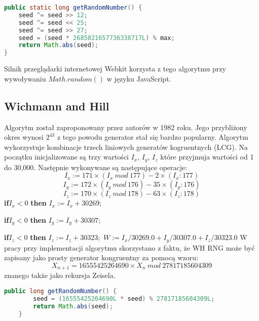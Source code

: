 \documentclass[a4paper, 11pt]{article} %
\begin{document}
\begin{lstlisting}[style=mystyle, language=java, frame=single, caption = Generowanie następnej liczby pseudolosowej przez Xorshift]
public static long getRandomNumber() {
    seed ^= seed >> 12;
    seed ^= seed << 25;
    seed ^= seed >> 27;
    seed = (seed * 2685821657736338717L) % max;
    return Math.abs(seed);
}
\end{lstlisting}
Silnik przeglądarki internetowej Webkit korzysta z tego algorytmu przy wywoływaniu $Math.random()$ w języku JavaScript.
\subsection{Wichmann and Hill}
Algorytm został zaproponowany przez autorów w 1982 roku. Jego przybliżony okres wynosi $2^{43}$ z tego powodu generator stał się bardzo popularny. Algorytm wykorzystuje kombinacje trzech liniowych generatów kogruentnych (LCG). Na początku inicjalizowane są trzy wartości $I_x$, $I_y$, $ I_z$ które przyjmuja wartości od 1 do 30,000. Następnie wykonywane są następujące operacje: 
$$I_x := 171 \times (I_x \  mod \ 177) - 2 \times (I_x : 177) $$
$$I_y := 172 \times (I_y\ mod\ 176) - 35 \times (I_y : 176) $$
$$ I_z := 170 \times (I_z\ mod \ 178) - 63 \times (I_z : 178)$$
\textbf{if}$I_x < 0$ \textbf{then}
\newline \indent	$I_x := I_x + 30269;$

\noindent \textbf{if}$I_y < 0$ \textbf{then}
\newline \indent	$I_y := I_y + 30307;$

\noindent \textbf{if}$I_z < 0$ \textbf{then}
\newline \indent	$I_z := I_z + 30323;$
\noindent \newline $W := I_x/30269.0 + I_y/30307.0 + I_z/30323.0$
\newline W pracy przy implementacji algorytmu skorzystano z faktu, że WH RNG może być zapisany jako prosty generator kongruentny za pomocą wzoru: 
$$X_{n+1} = 16555425264690 \times X_n\ mod\ 27817185604309 $$
znanego także jako rekursja Zeisela.

\begin{lstlisting}[style=mystyle, language=java, frame=single, caption = Generowanie następnej liczby pseudolosowej przez algorytm Wichmanna-Hilla na podstawie rekursji Zeisela.]
    public long getRandomNumber() {
        seed = (16555425264690L * seed) % 27817185604309L;
        return Math.abs(seed);
    }
\end{lstlisting}
\end{document}
